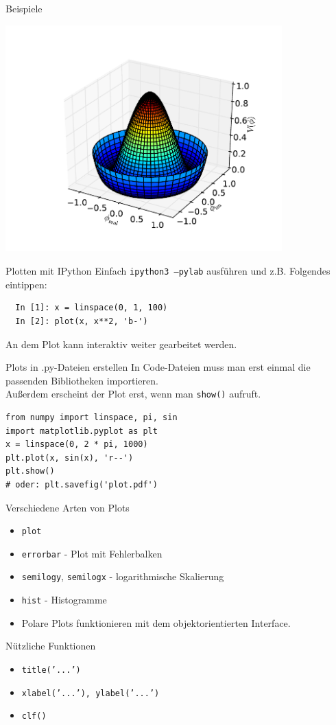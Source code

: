 \begin{frame}{Beispiele}
  \begin{center}
    \includegraphics[width=0.8\textwidth]{img/matplotlib/mplot3d.pdf}
  \end{center}
\end{frame}

\begin{frame}[fragile]{Plotten mit IPython}
  Einfach \texttt{ipython3 --pylab} ausführen und z.B. Folgendes eintippen:
\begin{verbatim}
  In [1]: x = linspace(0, 1, 100)
  In [2]: plot(x, x**2, 'b-')
\end{verbatim}
  An dem Plot kann interaktiv weiter gearbeitet werden.
\end{frame}

\begin{frame}[fragile]{Plots in .py-Dateien erstellen}
  In Code-Dateien muss man erst einmal die passenden Bibliotheken importieren.\\
  Außerdem erscheint der Plot erst, wenn man \verb|show()| aufruft.
\begin{verbatim}
from numpy import linspace, pi, sin
import matplotlib.pyplot as plt
x = linspace(0, 2 * pi, 1000)
plt.plot(x, sin(x), 'r--')
plt.show()
# oder: plt.savefig('plot.pdf')
\end{verbatim}
\end{frame}

\begin{frame}{Verschiedene Arten von Plots}
  \begin{itemize}
    \item \texttt{plot}
    \item \texttt{errorbar} - Plot mit Fehlerbalken
    \item \texttt{semilogy}, \texttt{semilogx} - logarithmische Skalierung
    \item \texttt{hist} - Histogramme
    \item Polare Plots funktionieren mit dem objektorientierten Interface.
  \end{itemize}
\end{frame}

\begin{frame}{Nützliche Funktionen}
  \begin{itemize}
    \item \texttt{title('...')}
    \item \texttt{xlabel('...'), ylabel('...')}
    \item \texttt{clf()}
  \end{itemize}
\end{frame}

